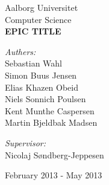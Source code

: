 \begin{titlingpage}
\color{fpcolor}
\centering
\vspace*{1.0cm}

\LARGE Aalborg Universitet\\[0.75cm]
\Large Computer Science\\[1.75cm]

\vspace{2.0cm}
{ \fontsize{26.2pt}{26.2pt} \bfseries EPIC TITLE}
\vspace{0.5cm}
\vspace{0.75cm}

\begin{minipage}{13.37cm}
  \begin{flushleft} \large
    \vspace{0pt}
    \emph{Authers:}\\
    Sebastian Wahl\\
    Simon Buus Jensen\\
    Elias Khazen Obeid\\
    Niels Sonnich Poulsen\\
    Kent Munthe Caspersen\\
    Martin Bjeldbak Madsen\\
  \end{flushleft}

  \begin{flushright} \large
    \vspace{-112pt}
    \emph{Supervisor:}\\
    Nicolaj Søndberg-Jeppesen
  \end{flushright}
\end{minipage}

\vfill

{\large February 2013 - May 2013}

\end{titlingpage}
